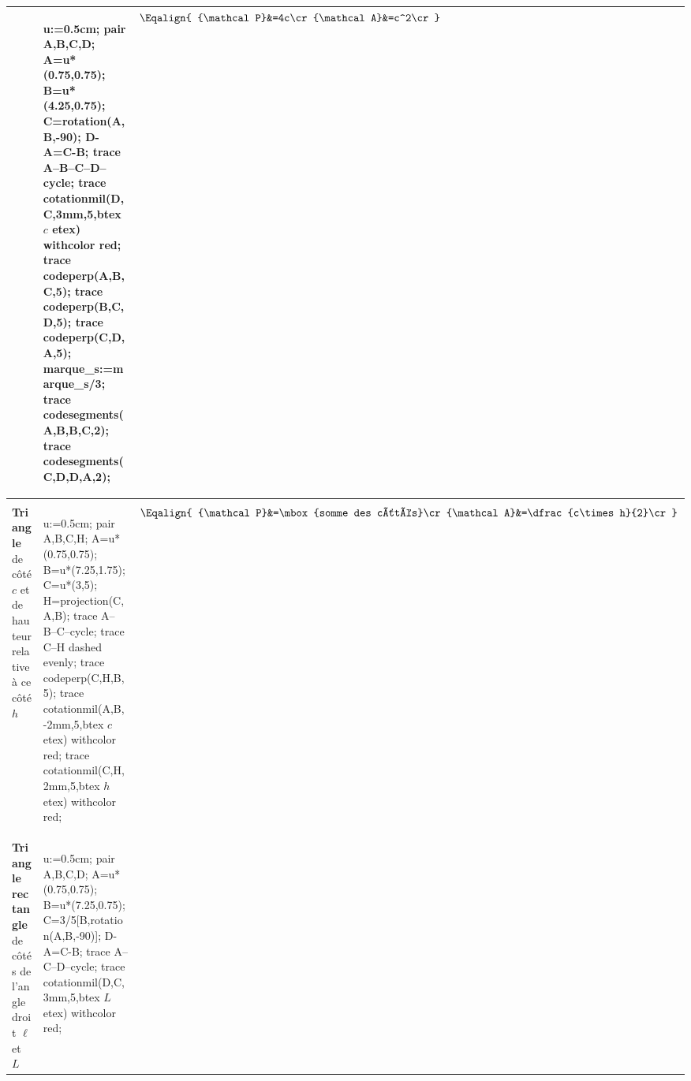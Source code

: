 {\begin{center}
\begin{longtable}{|>{\centering\arraybackslash}m{}|>{\centering\arraybackslash}m{}|>{\centering\arraybackslash}m{}|}
            &
            \rule[-0.5cm]{0pt}{3.2cm}            
            \begin{Geometrie}[CoinBG={(0,-.5u)},CoinHD={(5u,5.5u)}]
                u:=0.5cm;
                pair A,B,C,D;
                A=u*(0.75,0.75);
                B=u*(4.25,0.75);
                C=rotation(A,B,-90);
                D-A=C-B;
                trace A--B--C--D--cycle;
                trace cotationmil(D,C,3mm,5,btex $c$ etex) withcolor red;
                trace codeperp(A,B,C,5);
                trace codeperp(B,C,D,5);
                trace codeperp(C,D,A,5);
                marque_s:=marque_s/3;
                trace codesegments(A,B,B,C,2);
                trace codesegments(C,D,D,A,2);
            \end{Geometrie}
            &
            $\Eqalign{
            {\mathcal P}&=4c\cr
            {\mathcal A}&=c^2\cr
            }$\\\hline
            \multicolumn{3}{|c|}{\rule[-0.3cm]{0pt}{1cm}\LARGE\scshape Triangles}\\\hline
            \textbf{ Triangle} de côté $c$ et de hauteur relative à ce côté $h$
            &
            \rule[-0.5cm]{0pt}{3.2cm}
            \begin{Geometrie}[CoinBG={(0,-.5u)},CoinHD={(8u,6.5u)}]
                u:=0.5cm;
                pair A,B,C,H;
                A=u*(0.75,0.75);
                B=u*(7.25,1.75);
                C=u*(3,5);
                H=projection(C,A,B);
                trace A--B--C--cycle;
                trace C--H dashed evenly;
                trace codeperp(C,H,B,5);
                trace cotationmil(A,B,-2mm,5,btex $c$ etex) withcolor red;
                trace cotationmil(C,H,2mm,5,btex $h$ etex) withcolor red;
            \end{Geometrie}
            &$\Eqalign{
            {\mathcal P}&=\mbox{somme des côtés}\cr
            {\mathcal A}&=\dfrac{c\times h}{2}\cr
            }$\\\hline
            \textbf{ Triangle rectangle} de côtés de l'angle droit $\ell$ et $L$
            &
            \rule[-0.5cm]{0pt}{3.2cm}            
            \begin{Geometrie}[CoinBG={(-.5u,-.5u)},CoinHD={(8u,6.5u)}]
                u:=0.5cm;
                pair A,B,C,D;
                A=u*(0.75,0.75);
                B=u*(7.25,0.75);
                C=3/5[B,rotation(A,B,-90)];
                D-A=C-B;
                trace A--C--D--cycle;
                trace cotationmil(D,C,3mm,5,btex $L$ etex) withcolor red;

\end{Geometrie}
\end{longtable}
\end{center}}
